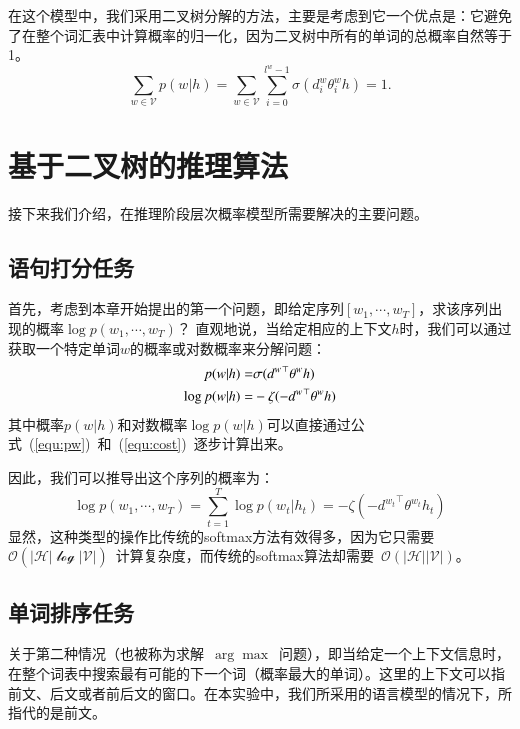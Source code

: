 在这个模型中，我们采用二叉树分解的方法，主要是考虑到它一个优点是：它避免了在整个词汇表中计算概率的归一化，因为二叉树中所有的单词的总概率自然等于1。
\begin{equation}
\sum_{w\in \mathcal{V}}{p(w|h)}=\sum_{w \in \mathcal{V}}\sum_{i=0}^{l^w-1}{\sigma(d_i^w\theta_{i}^w h)}=1.
\end{equation}



\section{基于二叉树的推理算法}
接下来我们介绍，在推理阶段层次概率模型所需要解决的主要问题。
\subsection{语句打分任务}
首先，考虑到本章开始提出的第一个问题，即给定序列$ [w_1,\cdots,w_T] $，求该序列出现的概率$   \log p(w_1,\cdots, w_T)$？ 直观地说，当给定相应的上下文$ h $时，我们可以通过获取一个特定单词$ w $的概率或对数概率来分解问题：
\begin{equation}
\setlength{\abovedisplayskip}{10pt}
\setlength{\belowdisplayskip}{10pt}
\begin{split}
    p(w|h) =&\sigma({d^w}^\top \theta^w h)\\
   \log p(w|h) =& -\zeta(- {d^{w}}^\top \theta^{w} h )
\end{split}
\end{equation}
其中概率$ p(w|h)$和对数概率$\log p(w | h)$可以直接通过公式~(\ref{equ:pw})~和~(\ref{equ:cost})~逐步计算出来。

因此，我们可以推导出这个序列的概率为：
\begin{equation}
   \log p(w_1,\cdots, w_T)=\sum_{t=1}^T\log p(w_t|h_t) = -\zeta(- {d^{w_t}}^\top \theta^{w_t} h_t )
\end{equation}
显然，这种类型的操作比传统的softmax方法有效得多，因为它只需要~$\mathcal{O}(\mathcal{|H|\log|V|})$~计算复杂度，而传统的softmax算法却需要~$\mathcal{O}(\mathcal{|H||V|})$。

\subsection{单词排序任务}
关于第二种情况（也被称为求解~$\arg\max$~问题），即当给定一个上下文信息时，在整个词表中搜索最有可能的下一个词（概率最大的单词）。这里的上下文可以指前文、后文或者前后文的窗口。在本实验中，我们所采用的语言模型的情况下，所指代的是前文。

